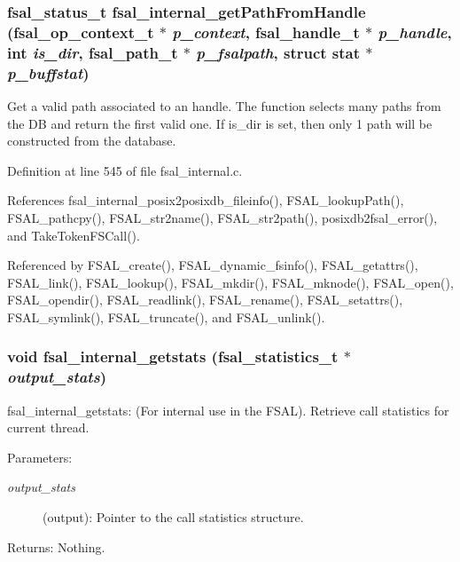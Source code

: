 \subsubsection[{fsal\_\-internal\_\-getPathFromHandle}]{\setlength{\rightskip}{0pt plus 5cm}fsal\_\-status\_\-t fsal\_\-internal\_\-getPathFromHandle (fsal\_\-op\_\-context\_\-t $\ast$ {\em p\_\-context}, \/  fsal\_\-handle\_\-t $\ast$ {\em p\_\-handle}, \/  int {\em is\_\-dir}, \/  fsal\_\-path\_\-t $\ast$ {\em p\_\-fsalpath}, \/  struct stat $\ast$ {\em p\_\-buffstat})}\label{fsal__internal_8c_8d7973ac418bb14f4a6c00e4618ea7e1}


Get a valid path associated to an handle. The function selects many paths from the DB and return the first valid one. If is\_\-dir is set, then only 1 path will be constructed from the database. 

Definition at line 545 of file fsal\_\-internal.c.

References fsal\_\-internal\_\-posix2posixdb\_\-fileinfo(), FSAL\_\-lookupPath(), FSAL\_\-pathcpy(), FSAL\_\-str2name(), FSAL\_\-str2path(), posixdb2fsal\_\-error(), and TakeTokenFSCall().

Referenced by FSAL\_\-create(), FSAL\_\-dynamic\_\-fsinfo(), FSAL\_\-getattrs(), FSAL\_\-link(), FSAL\_\-lookup(), FSAL\_\-mkdir(), FSAL\_\-mknode(), FSAL\_\-open(), FSAL\_\-opendir(), FSAL\_\-readlink(), FSAL\_\-rename(), FSAL\_\-setattrs(), FSAL\_\-symlink(), FSAL\_\-truncate(), and FSAL\_\-unlink().
\subsubsection[{fsal\_\-internal\_\-getstats}]{\setlength{\rightskip}{0pt plus 5cm}void fsal\_\-internal\_\-getstats (fsal\_\-statistics\_\-t $\ast$ {\em output\_\-stats})}\label{fsal__internal_8c_6de88949985cac9da4cd3fb302fb80a7}


fsal\_\-internal\_\-getstats: (For internal use in the FSAL). Retrieve call statistics for current thread.

\begin{Desc}
\item[Parameters:]
\begin{description}
\item[{\em output\_\-stats}](output): Pointer to the call statistics structure.\end{description}
\end{Desc}
\begin{Desc}
\item[Returns:]Nothing. \end{Desc}


